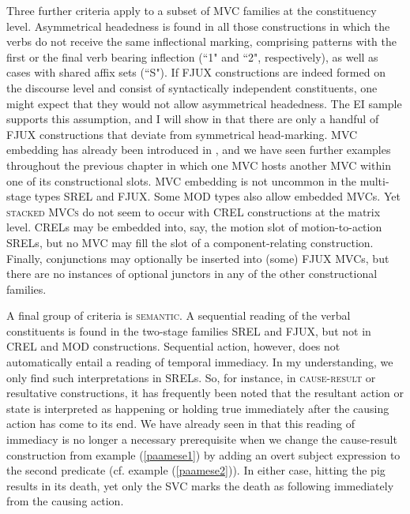 \largerpage[-1]
Three further criteria apply to a subset of MVC families at the constituency level. Asymmetrical headedness is found in all those constructions in which the verbs do not receive the same inflectional marking, comprising patterns with the first or the final verb bearing inflection (``1" and ``2", respectively), as well as cases with shared affix sets (``S"). If FJUX constructions are indeed formed on the discourse level and consist of syntactically independent constituents, one might expect that they would not allow asymmetrical headedness. The EI sample supports this assumption, and I will show in  that there are only a handful of FJUX constructions that deviate from symmetrical head-marking. MVC embedding has already been introduced in , and we have seen further examples throughout the previous chapter in which one MVC hosts another MVC within one of its constructional slots. MVC embedding is not uncommon in the multi-stage types SREL and FJUX. Some MOD types also allow embedded MVCs. Yet \textsc{stacked MVCs} do not seem to occur with CREL constructions at the matrix level. CRELs may be embedded into, say, the motion slot of motion-to-action SRELs, but no MVC may fill the slot of a component-relating construction. Finally, conjunctions may optionally be inserted into (some) FJUX MVCs, but there are no instances of optional junctors in any of the other constructional families.

A final group of criteria is \textsc{semantic}. A sequential reading of the verbal constituents is found in the two-stage families SREL and FJUX, but not in CREL and MOD constructions. Sequential action, however, does not automatically entail a reading of temporal immediacy. In my understanding, we only find such interpretations in SRELs. So, for instance, in \textsc{cause-result} or resultative constructions, it has frequently been noted that the resultant action or state is interpreted as happening or holding true immediately after the causing action has come to its end. We have already seen in  that this reading of immediacy is no longer a necessary prerequisite when we change the  cause-result construction from example (\ref{paamese1}) by adding an overt subject expression to the second predicate (cf. example (\ref{paamese2})). In either case, hitting the pig results in its death, yet only the SVC marks the death as following immediately from the causing action. 

